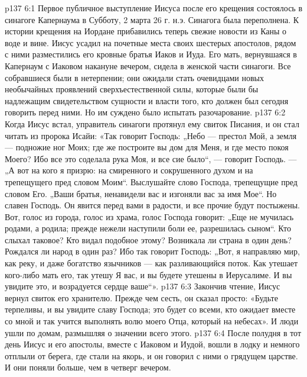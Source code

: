 \vs p137 6:1 Первое публичное выступление Иисуса после его крещения состоялось в синагоге Капернаума в Субботу, 2 марта 26 г. н.э. Синагога была переполнена. К истории крещения на Иордане прибавились теперь свежие новости из Каны о воде и вине. Иисус усадил на почетные места своих шестерых апостолов, рядом с ними разместились его кровные братья Иаков и Иуда. Его мать, вернувшаяся в Капернаум с Иаковом накануне вечером, сидела в женской части синагоги. Все собравшиеся были в нетерпении; они ожидали стать очевидцами новых необычайных проявлений сверхъестественной силы, которые были бы надлежащим свидетельством сущности и власти того, кто должен был сегодня говорить перед ними. Но им суждено было испытать разочарование.
\vs p137 6:2 Когда Иисус встал, управитель синагоги протянул ему свиток Писания, и он стал читать из пророка Исайи: «Так говорит Господь: „Небо --- престол Мой, а земля --- подножие ног Моих; где же построите вы дом для Меня, и где место покоя Моего? Ибо все это соделала рука Моя, и все сие было“, --- говорит Господь. --- „А вот на кого я призрю: на смиренного и сокрушенного духом и на трепещущего пред словом Моим“. Выслушайте слово Господа, трепещущие пред словом Его. „Ваши братья, ненавидели вас и изгоняли вас за имя Мое“. Но славен Господь. Он явится перед вами в радости, и все прочие будут постыжены. Вот, голос из города, голос из храма, голос Господа говорит: „Еще не мучилась родами, а родила; прежде нежели наступили боли ее, разрешилась сыном“. Кто слыхал таковое? Кто видал подобное этому? Возникала ли страна в один день? Рождался ли народ в один раз? Ибо так говорит Господь: „Вот, я направляю мир, как реку, и даже богатство язычников --- как разливающийся поток. Как утешает кого\hyp{}либо мать его, так утешу Я вас, и вы будете утешены в Иерусалиме. И вы увидите это, и возрадуется сердце ваше“».
\vs p137 6:3 Закончив чтение, Иисус вернул свиток его хранителю. Прежде чем сесть, он сказал просто: «Будьте терпеливы, и вы увидите славу Господа; это будет со всеми, кто ожидает вместе со мной и так учится выполнять волю моего Отца, который на небесах». И люди ушли по домам, размышляя о значении всего этого.
\vs p137 6:4 \pc После полудня в тот день Иисус и его апостолы, вместе с Иаковом и Иудой, вошли в лодку и немного отплыли от берега, где стали на якорь, и он говорил с ними о грядущем царстве. И они поняли больше, чем в четверг вечером.
